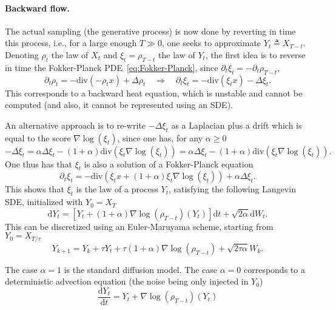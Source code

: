 \paragraph{Backward flow.}
The actual sampling (the generative process) is now done by reverting in time this process, i.e., for a large enough $T \gg 0$, one seeks to approximate $Y_t \triangleq X_{T-t}$. 
%
Denoting $\rho_t$ the law of $X_t$ and $\xi_t = \rho_{T-t}$ the law of $Y_t$, the first idea is to reverse in time the Fokker-Planck PDE~\eqref{eq:Fokker-Planck}, since $\partial_t \xi_t=-\partial_t \rho_{T-t}$,
\begin{equation*}
	\partial_t \rho_t = -\text{div}(- \rho_t x) + \Delta \rho_t
	\quad\Rightarrow\quad
	\partial_t \xi_t = -\text{div}( \xi_t x) - \Delta \xi_t.
\end{equation*}
This corresponds to a backward heat equation, which is unstable and cannot be computed (and also, it cannot be represented using an SDE).

An alternative approach is to re-write $- \Delta \xi_t$ as a Laplacian plus a drift which is equal to the score $\nabla \log(\xi_t)$, since one has, for any $\alpha\geq 0$
\begin{equation*}
	- \Delta \xi_t	 = \alpha \Delta \xi_t	- (1+\alpha) \text{div}(\xi_t \nabla \log(\xi_t) ) 
		=  \alpha \Delta \xi_t	-  (1+\alpha) \text{div}(\xi_t \nabla \log(\xi_t)).
\end{equation*}
One thus has that $\xi_t$ is also a solution of a Fokker-Planck equation
\begin{equation*}
	\partial_t \xi_t = -\text{div}( \xi_{t} x +  (1+\alpha) \xi_t \nabla \log(\xi_t) ) +  \alpha \Delta \xi_t.
\end{equation*}
This shows that $\xi_t$ is the law of a process $Y_t$, satisfying the following Langevin SDE, initialized with $Y_0=X_T$
\begin{equation*}
	\mathrm{d} Y_t = [ Y_t +  (1+\alpha) \nabla \log(\rho_{T-t})(Y_t) ] \mathrm{d} t + \sqrt{2\alpha} \mathrm{d} W_t. 
\end{equation*}
This can be discretized using an Euler-Maruyama scheme, starting from $Y_0=X_{T/\tau}$
\begin{equation}\label{eq:diffusion-discr-bwd}
	Y_{k+1} = Y_k + \tau Y_t + \tau  (1+\alpha) \nabla \log(\rho_{T-t})  + \sqrt{2\tau \alpha} W_k. 
\end{equation}

The case $\alpha=1$ is the standard diffusion model. The case $\alpha=0$ corresponds to a deterministic advection equation (the noise being only injected in $Y_0$)
\begin{equation}
	\frac{\mathrm{d} Y_t}{\mathrm{d} t} = Y_t + \nabla \log(\rho_{T-t})(Y_t)
\end{equation}

